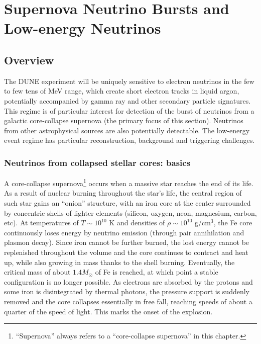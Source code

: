 
\chapter{Supernova Neutrino Bursts and Low-energy Neutrinos}
\label{ch:physics-snblowe}

\section{Overview}
\label{sec:physics-snblowe-overview}

The DUNE experiment will be uniquely sensitive to electron neutrinos in the few to few
tens of MeV range, which create short electron tracks in liquid argon, potentially accompanied by
gamma ray and other secondary particle signatures.  This regime is of
particular interest for detection of the burst of neutrinos from a galactic
core-collapse supernova (the primary focus of this section). 
Neutrinos from other astrophysical sources are also potentially detectable.
The low-energy event regime has particular reconstruction, background and triggering challenges.

\subsection{Neutrinos from collapsed stellar cores: basics}

A core-collapse supernova\footnote{``Supernova'' always
  refers to a ``core-collapse supernova'' in this chapter.} occurs when a massive star reaches the end of its
life. As a result of nuclear burning throughout the star's life, the central region of such star gains an ``onion'' structure, with an iron core at the center surrounded by concentric shells of lighter elements (silicon, oxygen, neon, magnesium, carbon, etc). At temperatures of $T\sim 10^{10}$ K and densities of $\rho \sim 10^{10}$ g/cm$^{3}$, the Fe core continuously loses energy by neutrino emission (through pair annihilation and plasmon decay). Since iron cannot be further burned, the lost energy cannot be replenished throughout the volume and the core continues to contract and heat up, while also growing in mass thanks to the shell burning. Eventually, the critical mass of about $1.4 M_{\odot}$ of Fe is reached, at which point a stable configuration is no longer possible. As electrons are absorbed by the protons and some iron is disintegrated by thermal photons, the pressure support is suddenly removed and the core collapses essentially in free fall, reaching speeds of about a quarter of the speed of light. This marks the onset of the explosion.

